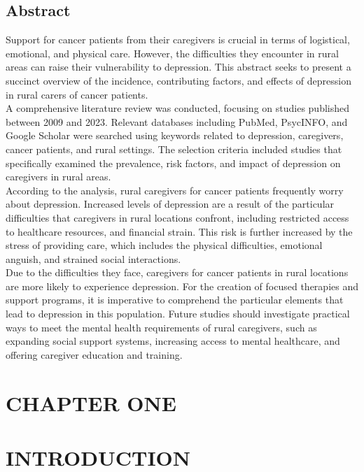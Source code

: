 \documentclass[11pt]{article}\usepackage[]{graphicx}\usepackage[]{xcolor}
\numberwithin{equation}{section}
\numberwithin{table}{section}
\begin{document}
	\newpage
	\subsection{Abstract}
Support for cancer patients from their caregivers is crucial in terms of logistical, emotional, and physical care. However, the difficulties they encounter in rural areas can raise their vulnerability to depression. This abstract seeks to present a succinct overview of the incidence, contributing factors, and effects of depression in rural carers of cancer patients.\\
A comprehensive literature review was conducted, focusing on studies published between 2009 and 2023. Relevant databases including PubMed, PsycINFO, and Google Scholar were searched using keywords related to depression, caregivers, cancer patients, and rural settings. The selection criteria included studies that specifically examined the prevalence, risk factors, and impact of depression on caregivers in rural areas.\\
According to the analysis, rural caregivers for cancer patients frequently worry about depression. Increased levels of depression are a result of the particular difficulties that caregivers in rural locations confront, including restricted access to healthcare resources, and financial strain. This risk is further increased by the stress of providing care, which includes the physical difficulties, emotional anguish, and strained social interactions.\\
Due to the difficulties they face, caregivers for cancer patients in rural locations are more likely to experience depression. For the creation of focused therapies and support programs, it is imperative to comprehend the particular elements that lead to depression in this population. Future studies should investigate practical ways to meet the mental health requirements of rural caregivers, such as expanding social support systems, increasing access to mental healthcare, and offering caregiver education and training.
	
	\clearpage
	
\section*{CHAPTER ONE}
\section*{INTRODUCTION}
\setcounter{section}{1}
\setcounter{subsection}{0}
\end{document}
